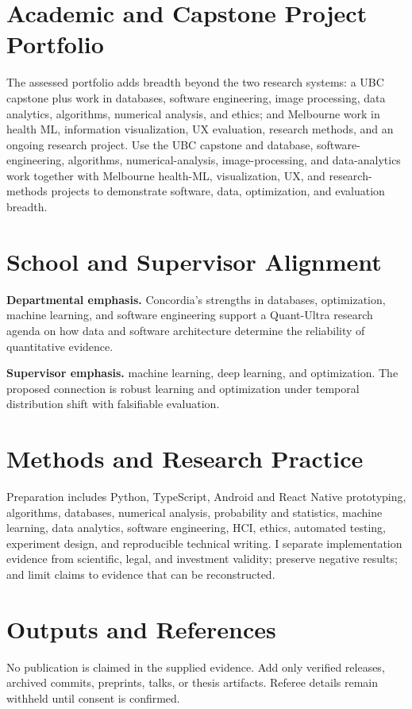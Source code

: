 \documentclass[11pt]{article}
\begin{document}
\section*{Academic and Capstone Project Portfolio}
The assessed portfolio adds breadth beyond the two research systems: a UBC capstone plus work in databases, software engineering, image processing, data analytics, algorithms, numerical analysis, and ethics; and Melbourne work in health ML, information visualization, UX evaluation, research methods, and an ongoing research project. Use the UBC capstone and database, software-engineering, algorithms, numerical-analysis, image-processing, and data-analytics work together with Melbourne health-ML, visualization, UX, and research-methods projects to demonstrate software, data, optimization, and evaluation breadth.

\section*{School and Supervisor Alignment}
\textbf{Departmental emphasis.} Concordia's strengths in databases, optimization, machine learning, and software engineering support a Quant-Ultra research agenda on how data and software architecture determine the reliability of quantitative evidence.

\textbf{Supervisor emphasis.} machine learning, deep learning, and optimization. The proposed connection is robust learning and optimization under temporal distribution shift with falsifiable evaluation.

\section*{Methods and Research Practice}
Preparation includes Python, TypeScript, Android and React Native prototyping, algorithms, databases, numerical analysis, probability and statistics, machine learning, data analytics, software engineering, HCI, ethics, automated testing, experiment design, and reproducible technical writing. I separate implementation evidence from scientific, legal, and investment validity; preserve negative results; and limit claims to evidence that can be reconstructed.

\section*{Outputs and References}
No publication is claimed in the supplied evidence. Add only verified releases, archived commits, preprints, talks, or thesis artifacts. Referee details remain withheld until consent is confirmed.
\end{document}
